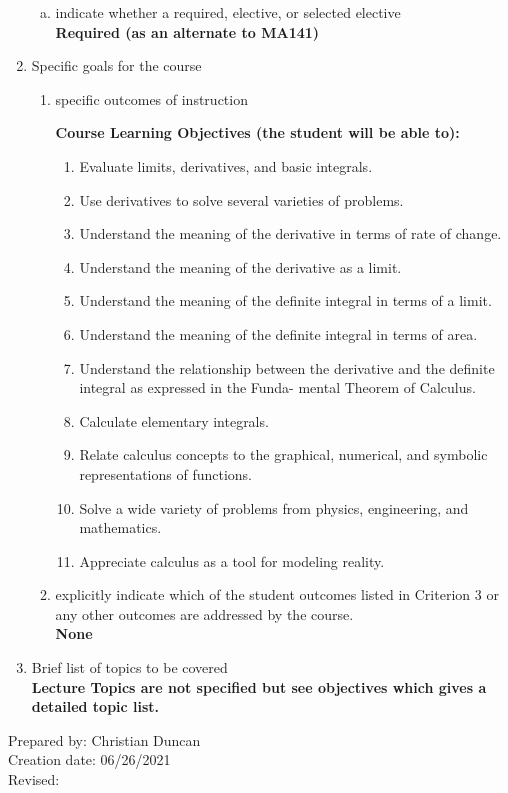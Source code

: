 \begin{enumerate}[1.]
\begin{enumerate}[a.]
\item indicate whether a required, elective, or selected elective\\ %
  {\bfseries
    Required (as an alternate to MA141)
  }

\end{enumerate}

\item Specific goals for the course
\begin{enumerate}
\item specific outcomes of instruction\\ %
  {\bfseries
    Course Learning Objectives (the student will be able to):
    \begin{enumerate}[1.]
\item Evaluate limits, derivatives, and basic integrals.
\item Use derivatives to solve several varieties of problems.
\item Understand the meaning of the derivative in terms of rate of change.
\item Understand the meaning of the derivative as a limit.
\item Understand the meaning of the definite integral in terms of a limit.
\item Understand the meaning of the definite integral in terms of area.
\item Understand the relationship between the derivative and the definite integral as expressed in the Funda-
mental Theorem of Calculus.
\item Calculate elementary integrals.
\item Relate calculus concepts to the graphical, numerical, and symbolic representations of functions.
\item Solve a wide variety of problems from physics, engineering, and mathematics.
\item Appreciate calculus as a tool for modeling reality.
    \end{enumerate}
  }

\item explicitly indicate which of the student outcomes listed in Criterion 3 or any other outcomes are addressed by the course.\\
  {\bfseries
    None
  }
\end{enumerate}

\item Brief list of topics to be covered\\
  {\bfseries
    Lecture Topics are not specified but see objectives which gives a detailed topic list.
  }

\end{enumerate}

\noindent Prepared by: Christian Duncan\\
\noindent Creation date: 06/26/2021\\
\noindent Revised:\\
